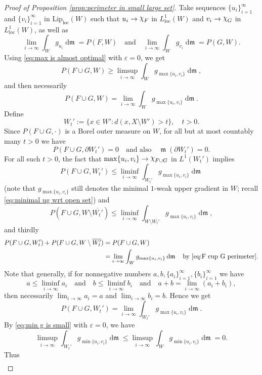 \documentclass[11pt]{article}
\numberwithin{equation}{section}
\theoremstyle{plain}
\theoremstyle{definition}
\numberwithin{equation}{section}
\newcommand{\eps}{\varepsilon}
\newcommand{\loc}{\mathrm{loc}}
\newcommand{\liploc}{\mathrm{Lip}_{\mathrm{loc}}}
\newcommand{\ch}{\text{\raise 1.3pt \hbox{$\chi$}\kern-0.2pt}}
\DeclareMathOperator{\frm}{\mathfrak{m}}
\DeclareMathOperator{\dfrm}{d\mathfrak{m}}
\begin{document}
\begin{proof}[Proof of Proposition \ref{prop:perimeter in small large set}]
Take sequences $\{u_i\}_{i=1}^{\infty}$ and $\{v_i\}_{i=1}^{\infty}$
in $\liploc(W)$ such that
$u_i\to \ch_F$ in $L^1_{\loc}(W)$ and $v_i\to \ch_G$ in $L^1_{\loc}(W)$, as well as
\[
\lim_{i\to\infty}\int_{W} g_{u_i}\dfrm=P(F,W)\quad\textrm{and}\quad 
\lim_{i\to\infty}\int_{W} g_{v_i}\dfrm=P(G,W).
\]
Using \eqref{eq:max is almost optimal} with $\eps=0$, we get
\[
	P(F\cup G,W) \ge \limsup_{i\to\infty}\int_{W}g_{\max \{u_i,v_i\}}\dfrm,
\]
and then necessarily
\begin{equation}\label{eq:F cup G perimeter}
P(F\cup G,W) = \lim_{i\to\infty}\int_{W}g_{\max \{u_i,v_i\}}\dfrm.
\end{equation}
Define
\[
W_t':=\{x\in W'\colon d(x,X\setminus W')>t\},\quad t>0.
\]
Since $P(F\cup G,\cdot)$ is a Borel outer measure on $W$,
for all but at most countably many $t>0$ we have
\[
P(F\cup G,\partial W_t')=0\quad\textrm{and also}\quad \frm(\partial W_t')=0.
\]
For all such $t>0$, the fact that $\max \{u_i,v_i\}\to \ch_{F\cup G}$ in $L^1(W_t')$ implies
\[
P(F\cup G,W_t')\le \liminf_{i\to\infty}\int_{W_t'}g_{\max \{u_i,v_i\}}\dfrm
\]
(note that $g_{\max \{u_i,v_i\}}$ still denotes the minimal $1$-weak upper gradient in $W$;
recall \eqref{eq:minimal ug wrt open set})
and
\[
P(F\cup G,W\setminus \overline{W_t'})\le \liminf_{i\to\infty}\int_{W\setminus \overline{W_t'}}g_{\max \{u_i,v_i\}}\dfrm,
\]
and thirdly
\begin{align*}
P(F\cup G,W_t')+P(F\cup G,W\setminus \overline{W_t'})
&= P(F\cup G,W) \\
&=\lim_{i\to\infty}\int_{W} g_{\max \{u_i,v_i\}}\dfrm\quad
\textrm{by }\eqref{eq:F cup G perimeter}.
\end{align*}
Note that generally, if for nonnegative numbers $a,b,\{a_i\}_{i=1}^{\infty},\{b_i\}_{i=1}^{\infty}$ we have
\[
a\le \liminf_{i\to \infty}a_i\quad\textrm{and}\quad b\le \liminf_{i\to \infty}b_i
\quad\textrm{and}\quad a+b=\lim_{i\to\infty}(a_i+b_i),
\]
then necessarily $\lim_{i\to\infty}a_i=a$ and $\lim_{i\to\infty}b_i=b$.
Hence we get
\[
P(F\cup G,W_t')= \lim_{i\to\infty}\int_{W_t'}g_{\max \{u_i,v_i\}}\dfrm.
\]
By \eqref{eq:min g is small} with $\eps=0$, we have
\begin{equation}\label{eq:min g is small 2}
\limsup_{i\to\infty}\int_{W_t'}g_{\min\{u_i,v_i\}}\dfrm
\le \limsup_{i\to\infty}\int_{W}g_{\min\{u_i,v_i\}}\dfrm=0.
\end{equation}
Thus
\begin{align*}

\end{align*}
\end{proof}
\end{document}
